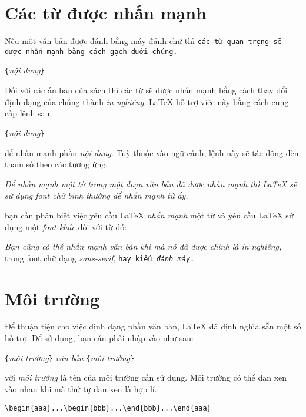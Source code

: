\section{Các từ được nhấn mạnh}
Nếu một văn bản được đánh bằng máy đánh chữ thì \texttt{các từ
quan trọng sẽ được nhấn mạnh bằng cách \underline{gạch dưới}
chúng.}
\begin{lscommand}
\verb|{|\emph{nội dung}\verb|}|
\end{lscommand}

\noindent Đối với các ấn bản của sách thì các từ sẽ được nhấn mạnh bằng cách thay đổi định dạng của chúng thành \emph{in nghiêng}. \LaTeX{} hỗ trợ việc này bằng cách cung cấp lệnh sau
\begin{lscommand}
\verb|{|\emph{nội dung}\verb|}|
\end{lscommand}
\noindent để nhấn mạnh phần \emph{nội dung}. Tuỳ thuộc vào ngữ cảnh, lệnh này sẽ tác động đến tham số theo các tương ứng:
\begin{example}
\emph{Để nhấn mạnh một  từ
trong một đoạn văn bản đã
được nhấn mạnh thì \LaTeX{}
sẽ sử dụng font chữ
\emph{bình thường}
để nhấn mạnh từ ấy.}
\end{example}
\noindent bạn cần phân biệt việc yêu cầu \LaTeX{} \emph{nhấn mạnh} một từ và yêu cầu \LaTeX{} sử dụng một \emph{font khác} đối với từ đó:
\begin{example}
\textit{Bạn cũng có thể
  \emph{nhấn mạnh} văn bản
  khi mà nó đã được chỉnh là
  in nghiêng,}
\textsf{trong font chữ dạng
  \emph{sans-serif},}
\texttt{hay kiểu
  \emph{đánh máy}.}
\end{example}

\section{Môi trường}\label{env}
Để thuận tiện cho việc định dạng phần văn bản, \LaTeX{} đã định nghĩa sẵn một số  hỗ trợ. Để sử dụng, bạn cần phải nhập vào như sau:
\begin{lscommand}
\verb|{|\emph{môi trường}\verb|}|\quad
   \emph{văn bản}\quad
{}\verb|{|\emph{môi trường}\verb|}|
\end{lscommand}
\noindent với \emph{môi trường} là tên của môi trường cần sử dụng. Môi trường có thể đan xen vào nhau khi mà thứ tự đan xen là hợp lí.
\begin{code}
\verb|\begin{aaa}...\begin{bbb}...\end{bbb}...\end{aaa}|
\end{code}

